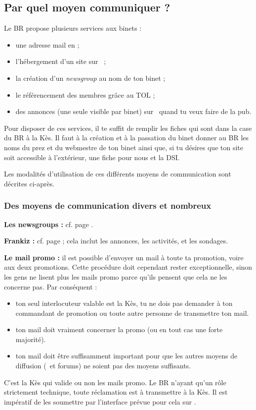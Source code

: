 \subsection{Par quel moyen communiquer ?}

Le BR propose plusieurs services aux binets :
\begin{itemize}
\item{une adresse mail en  ;}
\item{l'hébergement d'un site sur \fkz\ ;}
\item{la création d'un \emph{newsgroup} au nom de ton binet ;}
\item{le référencement des membres grâce au TOL ;}
\item{des annonces (une seule visible par binet) sur \fkz\ quand tu veux faire de la pub.}
\end{itemize}

Pour disposer de ces services, il te suffit de remplir les fiches qui sont dans la case du BR à la Kès. Il faut à la création et à la passation du binet
donner au BR les noms du prez et du webmestre de ton binet ainsi que, si tu désires que ton site soit accessible à l'extérieur, une fiche pour nous
et la DSI.

Les modalités d'utilisation de ces différents moyens de communication sont décrites ci-après.

\subsubsection{Des moyens de communication divers et nombreux}

\textbf{Les newsgroups :} cf. page \pageref{newsgroups}.

\textbf{Frankiz :} cf. page \pageref{frankiz} ; cela inclut les annonces, les activités, et les sondages.

\textbf{Le mail promo :} il est possible d'envoyer un mail à toute
ta promotion, voire aux deux promotions. Cette procédure doit
cependant rester exceptionnelle, sinon les gens ne lisent plus les
mails promo parce qu'ils pensent que cela ne les concerne pas. Par
conséquent :
\begin{itemize}
  \item ton seul interlocuteur valable est la Kès, tu ne dois pas demander à ton commandant de promotion
        ou toute autre personne de transmettre ton mail.
  \item ton mail doit vraiment concerner la promo (ou en tout cas une forte majorité).
  \item ton mail doit être suffisamment important pour que les autres moyens de diffusion (\fkz\ et forums) ne soient pas des moyens suffisants.
\end{itemize}
C'est la Kès qui valide ou non les mails promo. Le BR n'ayant qu'un rôle strictement technique, toute réclamation est à transmettre à la Kès. Il est
impératif de les soumettre par l'interface prévue pour cela sur \fkz.

